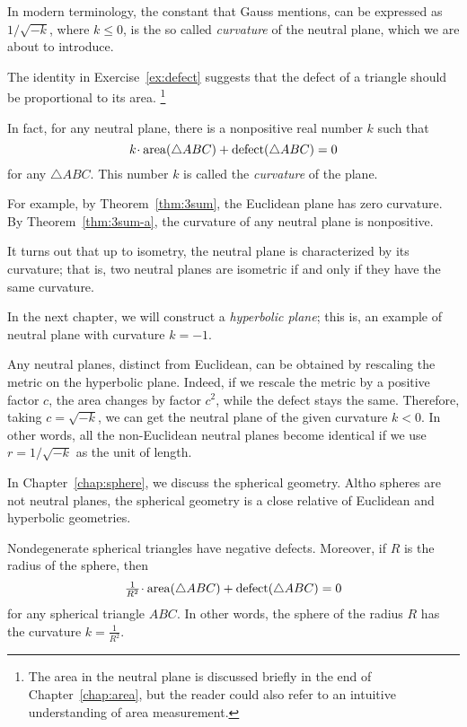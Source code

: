 In modern terminology, the constant that Gauss mentions, 
can be expressed as $1/\sqrt{-k}$, 
where $k\le 0$, is the so called \emph{curvature} of the neutral plane, which we are about to introduce.

The identity in Exercise~\ref{ex:defect} suggests that the defect of a triangle should be proportional to its area.%
\footnote{The area in the neutral plane is discussed briefly in the end of Chapter~\ref{chap:area},
but the reader could also refer to an intuitive understanding of area measurement.}

In fact, for any neutral plane, there is a nonpositive real number $k$
such that 
$$k\cdot\area(\triangle ABC)+\defect(\triangle ABC)=0$$
for any $\triangle ABC$.
This number $k$ is called the \emph{curvature} of the plane.

For example, by Theorem~\ref{thm:3sum}, the Euclidean plane has zero curvature.
By Theorem~\ref{thm:3sum-a}, the curvature of any neutral plane is nonpositive.

It turns out that up to isometry, the neutral plane is characterized by its curvature;
that is, two neutral planes are isometric if and only if they have the same curvature. 

In the next chapter, we will construct a {}\emph{hyperbolic plane};
this is, an example of neutral plane with curvature $k=-1$.

Any neutral planes, distinct from Euclidean,
can be obtained by rescaling the metric on the hyperbolic plane.
Indeed,
if we rescale the metric by a positive factor $c$,
the area changes by factor $c^2$, while the defect stays the same.
Therefore, taking $c=\sqrt{-k}$,
we can get the neutral plane of the given curvature $k<0$.
In other words, all the non-Euclidean neutral planes become identical
if we use $r=1/\sqrt{-k}$ as the unit of length.

\medskip

In Chapter~\ref{chap:sphere}, we discuss the spherical geometry.
Altho spheres are not neutral planes,
the spherical geometry is a close relative of Euclidean and hyperbolic geometries.

Nondegenerate spherical triangles have negative defects.
Moreover, 
if $R$ is the radius of the sphere, then
$$\tfrac1{R^2}\cdot\area(\triangle ABC)+\defect(\triangle ABC)=0$$
for any spherical triangle $ABC$.
In other words, 
the sphere of the radius $R$ has the curvature $k=\tfrac1{R^2}$.


